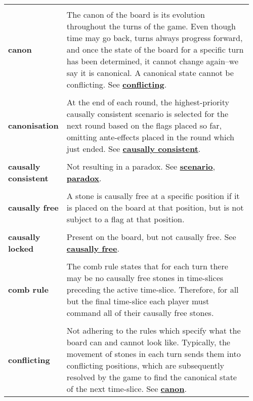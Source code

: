 {\begin{longtable}{ R{0.15\linewidth}  L{0.81\linewidth}  }
 \\* \textbf{canon} & \parbox[t]{\linewidth}{The canon of the board is its evolution throughout the turns of the game. Even though time may go back, turns always progress forward, and once the state of the board for a specific turn has been determined, it cannot change again--we say it is canonical. A canonical state cannot be conflicting. See \hyperref[glossary:conflicting]{\textbf{conflicting}}.}\\
 \\* \textbf{canonisation} & \parbox[t]{\linewidth}{At the end of each round, the highest-priority causally consistent scenario is selected for the next round based on the flags placed so far, omitting ante-effects placed in the round which just ended. See \hyperref[glossary:causally consistent]{\textbf{causally consistent}}.}\\
 \\* \textbf{causally consistent} & \parbox[t]{\linewidth}{Not resulting in a paradox. See \hyperref[glossary:scenario]{\textbf{scenario}}, \hyperref[glossary:paradox]{\textbf{paradox}}.}\\
 \\* \textbf{causally free} & \parbox[t]{\linewidth}{A stone is causally free at a specific position if it is placed on the board at that position, but is not subject to a flag at that position.}\\
 \\* \textbf{causally locked} & \parbox[t]{\linewidth}{Present on the board, but not causally free. See \hyperref[glossary:causally free]{\textbf{causally free}}.}\\
 \\* \textbf{comb rule} & \parbox[t]{\linewidth}{The comb rule states that for each turn there may be no causally free stones in time-slices preceding the active time-slice. Therefore, for all but the final time-slice each player must command all of their causally free stones.}\\
 \\* \textbf{conflicting} & \parbox[t]{\linewidth}{Not adhering to the rules which specify what the board can and cannot look like. Typically, the movement of stones in each turn sends them into conflicting positions, which are subsequently resolved by the game to find the canonical state of the next time-slice. See \hyperref[glossary:canon]{\textbf{canon}}.}\\

\end{longtable}}

